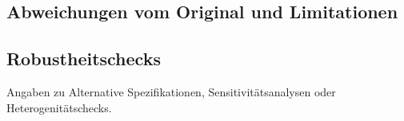 \subsection{Abweichungen vom Original und Limitationen}


\subsection{Robustheitschecks}
Angaben zu Alternative Spezifikationen, Sensitivitätsanalysen oder Heterogenitätschecks.
	
